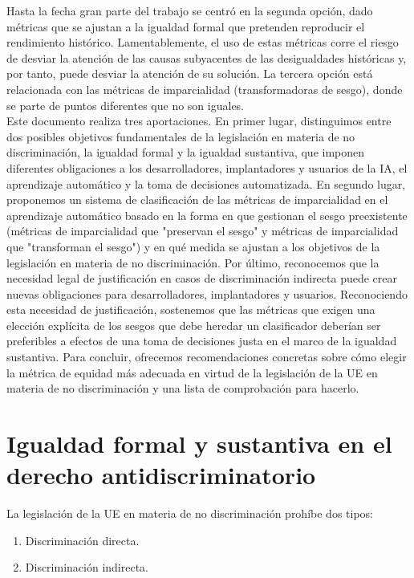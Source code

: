 Hasta la fecha gran parte del trabajo se centró en la segunda opción, dado métricas que se ajustan a la igualdad formal que pretenden reproducir el rendimiento histórico. Lamentablemente, el uso de estas métricas corre el riesgo de desviar la atención de las causas subyacentes de las desigualdades históricas y, por tanto, puede desviar la atención de su solución. La tercera opción está relacionada con las métricas de imparcialidad (transformadoras de sesgo), donde se parte de puntos diferentes que no son iguales.\\

Este documento realiza tres aportaciones. En primer lugar, distinguimos entre dos posibles objetivos fundamentales de la legislación en materia de no discriminación, la igualdad formal y la igualdad sustantiva, que imponen diferentes obligaciones a los desarrolladores, implantadores y usuarios de la IA, el aprendizaje automático y la toma de decisiones automatizada. En segundo lugar, proponemos un sistema de clasificación de las métricas de imparcialidad en el aprendizaje automático basado en la forma en que gestionan el sesgo preexistente (métricas de imparcialidad que "preservan el sesgo" y métricas de imparcialidad que "transforman el sesgo") y en qué medida se ajustan a los objetivos de la legislación en materia de no discriminación. Por último, reconocemos que la necesidad legal de justificación en casos de discriminación indirecta puede crear nuevas obligaciones para desarrolladores, implantadores y usuarios. Reconociendo esta necesidad de justificación, sostenemos que las métricas que exigen una elección explícita de los sesgos que debe heredar un clasificador deberían ser preferibles a efectos de una toma de decisiones justa en el marco de la igualdad sustantiva. Para concluir, ofrecemos recomendaciones concretas sobre cómo elegir la métrica de equidad más adecuada en virtud de la legislación de la UE en materia de no discriminación y una lista de comprobación para hacerlo.

\section{Igualdad formal y sustantiva en el derecho antidiscriminatorio}

La legislación de la UE en materia de no discriminación prohíbe dos tipos:

\begin{enumerate}[1.]
    \item Discriminación directa.
    \item Discriminación indirecta.
\end{enumerate}

